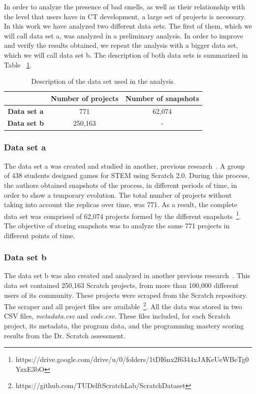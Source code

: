 In order to analyze the presence of bad smells, as well as their relationship with the level that users have in CT development, a large set of projects is necessary. In this work we have analyzed two different data sets. The first of them, which we will call data set a, was analyzed in a preliminary analysis. In order to improve and verify the results obtained, we repeat the analysis with a bigger data set, which we will call data set b. The description of both data sets is summarized in Table ~\ref{table:dataset}.

\begin{table}
 \begin{center}
  \begin{tabular}{|c|c|c|}
    \hline
    & \textbf{Number of projects} & \textbf{Number of snapshots} \\ \hline
    \textbf{Data set a} & 771 & 62,074 \\ \hline
    \textbf{Data set b} & 250,163 & - \\ \hline
  \end{tabular}
  \caption{Description of the data set used in the analysis.}
  \label{table:dataset}
 \end{center}
\end{table}


\subsubsection{Data set a}
\label{subsubsec:dataset_a}

The data set a was created and studied in another, previous research~\cite{troiano2019my}. A group of 438 students designed games for STEM using Scratch 2.0. During this process, the authors obtained snapshots of the process, in different periods of time, in order to show a temporary evolution. The total number of projects without taking into account the replicas over time, was 771. As a result, the complete data set was comprised of 62,074 projects formed by the different snapshots~\footnote{https://drive.google.com/drive/u/0/folders/1tDI6nx2f6344xJAKeUeWBeTg0YzxE3bO}. The objective of storing snapshots was to analyze the same 771 projects in different points of time.

\subsubsection{Data set b}
\label{subsubsec:dataser_b}

The data set b was also created and analyzed in another previous research~\cite{aivaloglou2017dataset}. This data set contained 250,163 Scratch projects, from more than 100,000 different users of its community. These projects were scraped from the Scratch repository. The scraper and all project files are available~\footnote{https://github.com/TUDelftScratchLab/ScratchDataset}. All the data was stored in two CSV files, \textit{metadata.csv} and \textit{code.csv}. These files included, for each Scratch project, its metadata, the program data, and the programming mastery scoring results from the Dr. Scratch assessment.


